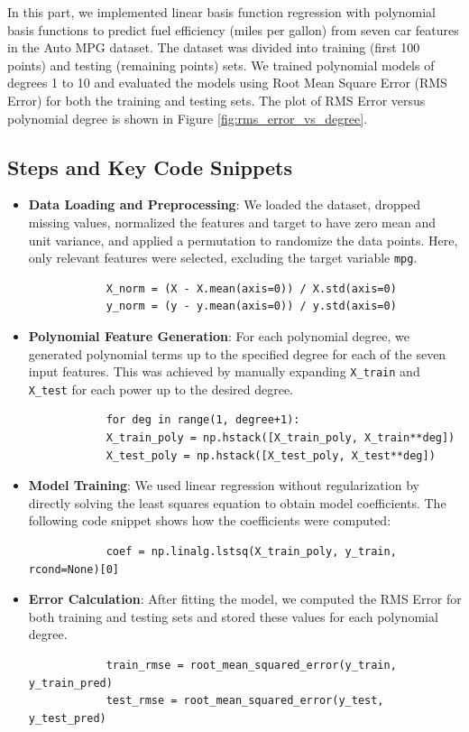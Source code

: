 \documentclass{article}
\begin{document}
	In this part, we implemented linear basis function regression with polynomial basis functions to predict fuel efficiency (miles per gallon) from seven car features in the Auto MPG dataset. The dataset was divided into training (first 100 points) and testing (remaining points) sets. We trained polynomial models of degrees 1 to 10 and evaluated the models using Root Mean Square Error (RMS Error) for both the training and testing sets. The plot of RMS Error versus polynomial degree is shown in Figure \ref{fig:rms_error_vs_degree}.
	
	\subsection*{Steps and Key Code Snippets}
	
	\begin{itemize}
		\item \textbf{Data Loading and Preprocessing}: We loaded the dataset, dropped missing values, normalized the features and target to have zero mean and unit variance, and applied a permutation to randomize the data points. Here, only relevant features were selected, excluding the target variable \texttt{mpg}.
		
		\begin{verbatim}
			X_norm = (X - X.mean(axis=0)) / X.std(axis=0)
			y_norm = (y - y.mean(axis=0)) / y.std(axis=0)
		\end{verbatim}
		
		\item \textbf{Polynomial Feature Generation}: For each polynomial degree, we generated polynomial terms up to the specified degree for each of the seven input features. This was achieved by manually expanding \texttt{X\_train} and \texttt{X\_test} for each power up to the desired degree.
		
		\begin{verbatim}
			for deg in range(1, degree+1):
			X_train_poly = np.hstack([X_train_poly, X_train**deg])
			X_test_poly = np.hstack([X_test_poly, X_test**deg])
		\end{verbatim}
		
		\item \textbf{Model Training}: We used linear regression without regularization by directly solving the least squares equation to obtain model coefficients. The following code snippet shows how the coefficients were computed:
		
		\begin{verbatim}
			coef = np.linalg.lstsq(X_train_poly, y_train, rcond=None)[0]
		\end{verbatim}
		
		\item \textbf{Error Calculation}: After fitting the model, we computed the RMS Error for both training and testing sets and stored these values for each polynomial degree.
		
		\begin{verbatim}
			train_rmse = root_mean_squared_error(y_train, y_train_pred)
			test_rmse = root_mean_squared_error(y_test, y_test_pred)
		\end{verbatim}
	\end{itemize}
	
\end{document}
